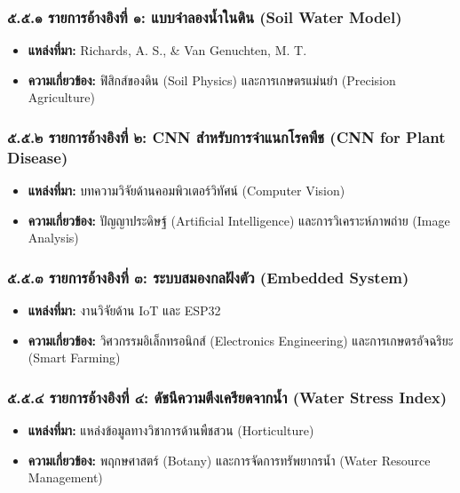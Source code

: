 \documentclass[11pt,a4paper,openany]{report}
\begin{document}
\subsubsection{๕.๕.๑ รายการอ้างอิงที่ ๑: แบบจำลองน้ำในดิน (Soil Water Model)}

\begin{itemize}
  \item \textbf{แหล่งที่มา:} Richards, A. S., \& Van Genuchten, M. T.
  \item \textbf{ความเกี่ยวข้อง:} ฟิสิกส์ของดิน (Soil Physics) และการเกษตรแม่นยำ (Precision Agriculture)
\end{itemize}


\subsubsection{๕.๕.๒ รายการอ้างอิงที่ ๒: CNN สำหรับการจำแนกโรคพืช (CNN for Plant Disease)}

\begin{itemize}
  \item \textbf{แหล่งที่มา:} บทความวิจัยด้านคอมพิวเตอร์วิทัศน์ (Computer Vision)
  \item \textbf{ความเกี่ยวข้อง:} ปัญญาประดิษฐ์ (Artificial Intelligence) และการวิเคราะห์ภาพถ่าย (Image Analysis)
\end{itemize}


\subsubsection{๕.๕.๓ รายการอ้างอิงที่ ๓: ระบบสมองกลฝังตัว (Embedded System)}

\begin{itemize}
  \item \textbf{แหล่งที่มา:} งานวิจัยด้าน IoT และ ESP32
  \item \textbf{ความเกี่ยวข้อง:} วิศวกรรมอิเล็กทรอนิกส์ (Electronics Engineering) และการเกษตรอัจฉริยะ (Smart Farming)
\end{itemize}


\subsubsection{๕.๕.๔ รายการอ้างอิงที่ ๔: ดัชนีความตึงเครียดจากน้ำ (Water Stress Index)}

\begin{itemize}
  \item \textbf{แหล่งที่มา:} แหล่งข้อมูลทางวิชาการด้านพืชสวน (Horticulture)
  \item \textbf{ความเกี่ยวข้อง:} พฤกษศาสตร์ (Botany) และการจัดการทรัพยากรน้ำ (Water Resource Management)
\end{itemize}
\end{document}
